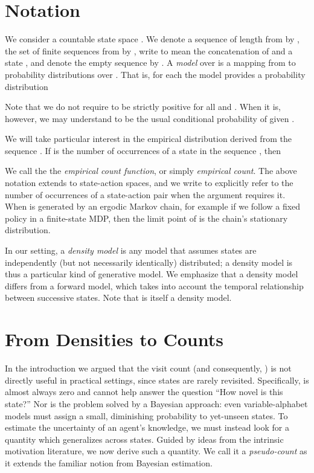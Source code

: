 \documentclass{article}
\begin{document}
\section{Notation}

We consider a countable state space .
We denote a sequence of length  from  by , the set of finite sequences from  by , write  to mean the concatenation of  and a state , and denote the empty sequence by .
A \emph{model} over  is a mapping from  to probability distributions over . That is, for each  the model provides a probability distribution

Note that we do not require  to be strictly positive for all  and . When it is, however, we may understand  to be the usual conditional probability of  given .

We will take particular interest in the empirical distribution  derived from the sequence . If  is the number of occurrences of a state  in the sequence , then

We call the  the \emph{empirical count function}, or simply \emph{empirical count}.
The above notation extends to state-action spaces, and we write  to explicitly refer to the number of occurrences of a state-action pair when the argument requires it. 
When  is generated by an ergodic Markov chain, for example if we follow a fixed policy in a finite-state MDP, then the limit point of  is the chain's stationary distribution.

In our setting, a \emph{density model} is any model that assumes states are independently (but not necessarily identically) distributed; a density model is thus a particular kind of generative model. We emphasize that a density model differs from a forward model, which takes into account the temporal relationship between successive states. Note that  is itself a density model.

\section{From Densities to Counts}\label{sec:prediction_to_counts}

In the introduction we argued that the visit count  (and consequently, ) is not directly useful in practical settings, since states are rarely revisited. Specifically,  is almost always zero and cannot help answer the question ``How novel is this state?'' Nor is the problem solved by a Bayesian approach: even variable-alphabet models \citep[e.g.][]{hutter13sparse} must assign a small, diminishing probability to yet-unseen states.
To estimate the uncertainty of an agent's knowledge, we must instead look for a quantity which generalizes across states. Guided by ideas from the intrinsic motivation literature, we now derive such a quantity. We call it a \emph{pseudo-count} as it extends the familiar notion from Bayesian estimation.
\end{document}
